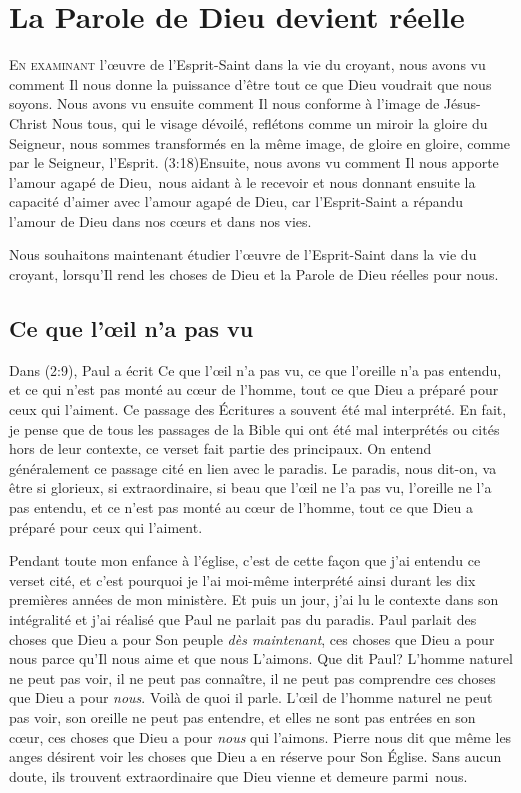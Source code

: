 \chapter{La Parole de Dieu devient r\'eelle}

\lettrine{E}{n examinant} l'\oe{}uvre
 de l'Esprit-Saint dans la vie du croyant,
 nous avons vu comment Il nous donne la puissance
 d'être tout ce que Dieu voudrait que nous soyons.
 Nous avons vu ensuite comment Il nous conforme à l'image de Jésus-Christ\frcolon{}
 \Og Nous tous, qui le visage dévoilé, reflétons comme un miroir la gloire
 du Seigneur, nous sommes transformés en la même image, de gloire en gloire,
 comme par le Seigneur, l'Esprit. \Fg{}
 (3:18)Ensuite, nous avons vu comment
 Il nous apporte l'amour agapé de Dieu,~nous aidant à le recevoir
 et nous donnant ensuite la capacité d'aimer
 avec l'amour agapé de Dieu, car l'Esprit-Saint a répandu l'amour de Dieu
 dans nos cœurs et dans nos vies.

Nous souhaitons maintenant étudier l'œuvre de l'Esprit-Saint dans la vie
 du croyant, lorsqu'Il rend les choses de Dieu et la Parole de Dieu
 réelles pour nous.


\section{Ce que l'\oe{}il n'a pas vu}

Dans (2:9), Paul a écrit\frcolon{}
 \Og Ce que l'œil n'a pas vu, ce que l'oreille n'a pas entendu,
 et ce qui n'est pas monté au cœur de l'homme, tout ce que Dieu
 a préparé pour ceux qui l'aiment. \Fg{}
 Ce passage des Écritures a souvent été mal interprété. En fait,
 je pense que de tous les passages de la Bible qui ont été mal interprétés
 ou cités hors de leur contexte, ce verset fait partie des principaux.
 On entend généralement ce passage cité en lien avec le paradis.
 Le paradis, nous dit-on, va être si glorieux, si extraordinaire,
 si beau que \Og l'œil ne l'a pas vu, l'oreille ne l'a pas entendu,
 et ce n'est pas monté au cœur de l'homme, tout ce que Dieu a préparé
 pour ceux qui l'aiment. \Fg{}
 \nowidow[4]

Pendant toute mon enfance à l'église, c'est de cette façon que j'ai entendu
 ce verset cité, et c'est pourquoi je l'ai moi-même interprété ainsi
 durant les dix premières années de mon ministère.
 Et puis un jour, j'ai lu le contexte dans son intégralité et j'ai réalisé
 que Paul ne parlait pas du paradis. Paul parlait des choses que Dieu
 a pour Son peuple \emph{dès maintenant},
 ces choses que Dieu a pour nous parce qu'Il
 nous aime et que nous L'aimons. Que dit Paul?
 L'homme naturel ne peut pas voir, il ne peut pas connaître,
 il ne peut pas comprendre ces choses que Dieu a pour \emph{nous}.
 Voilà de quoi il parle. L'œil de l'homme naturel ne peut pas voir,
 son oreille ne peut pas entendre, et elles ne sont pas entrées en son c\oe{}ur, ces choses que Dieu a pour \emph{nous} qui l'aimons.
 Pierre nous dit que même les anges désirent voir les choses que Dieu
 a en réserve pour Son Église.
 Sans aucun doute, ils trouvent extraordinaire que Dieu vienne
 et demeure parmi~nous.

